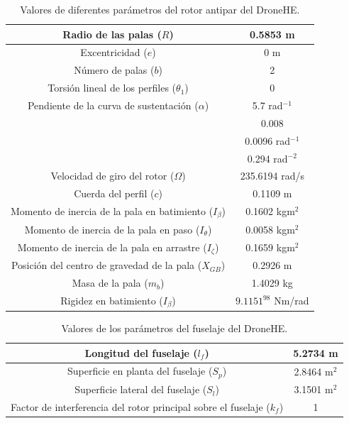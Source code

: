 \begin{table}[htbp]
	\centering
	\begin{tabular}{|>{\columncolor{Gray}}c|c|}
		\hline
		Radio de las palas ($R$) & 0.5853 m \\ \hline
		Excentricidad ($e$) & 0 m \\ \hline
		Número de palas ($b$) & 2 \\ \hline
		Torsión lineal de los perfiles ($\theta_1$) & \cellcolor[rgb]{ 1,  1,  1}0 \\ \hline
		Pendiente de la curva de sustentación ($\alpha$) & 5.7 rad$^{-1}$ \\ \hline
		\cellcolor{Gray} & 0.008 \\ \cline{2-2}
		\cellcolor{Gray} & 0.0096 rad$^{-1}$ \\ \cline{2-2}
		\multirow{-3}{*}{\cellcolor{Gray}Parámetros de la polar ($\delta_0$, $\delta_1$, $\delta_2$)} & 0.294 rad$^{-2}$ \\ \hline
		Velocidad de giro del rotor ($\Omega$) & \cellcolor[rgb]{ 1,  1,  1}235.6194 rad/s \\ \hline
		Cuerda del perfil ($c$) & \cellcolor[rgb]{ 1,  1,  1}0.1109 m \\ \hline
		Momento de inercia de la pala en batimiento ($I_\beta$) & 0.1602 kgm$^2$ \\ \hline
		Momento de inercia de la pala en paso ($I_\theta$) & 0.0058 kgm$^2$ \\ \hline
		Momento de inercia de la pala en arrastre ($I_\zeta$) & 0.1659 kgm$^2$ \\ \hline
		Posición del centro de gravedad de la pala ($X_{GB}$) & 0.2926 m \\ \hline
		Masa de la pala ($m_b$) & 1.4029 kg \\ \hline
		\cellcolor{Gray}Rigidez en batimiento ($I_\beta$) & $9.1151^{98}$ Nm/rad \\ \hline
	\end{tabular}%
	\caption{Valores de diferentes parámetros del rotor antipar del DroneHE.}
	\label{RaHS}
\end{table}%

\begin{table}[htbp]
	\centering
	\begin{tabular}{|>{\columncolor{Gray}}c|c|}
		\hline
		\cellcolor{Gray}Longitud del fuselaje ($l_f$) & \cellcolor[rgb]{ 1,  1,  1}5.2734 m \\ \hline
		\cellcolor{Gray}Superficie en planta del fuselaje ($S_p$)& \cellcolor[rgb]{ 1,  1,  1}2.8464 m$^2$ \\ \hline
		\cellcolor{Gray}Superficie lateral del fuselaje ($S_l$) & \cellcolor[rgb]{ 1,  1,  1}3.1501 m$^2$ \\ \hline
		\cellcolor{Gray}Factor de interferencia del rotor principal sobre el fuselaje ($k_f$) & \cellcolor[rgb]{ 1,  1,  1}1 \\ \hline
	\end{tabular}%
	\caption{Valores de los parámetros del fuselaje del DroneHE.}
	\label{FHS}
\end{table}%

